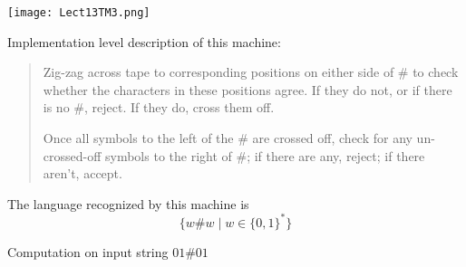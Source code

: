 \documentclass[12pt, oneside]{article}
\begin{document}
\begin{multicols}{2}
\vspace{-20pt}
\begin{center}
\texttt{[image: Lect13TM3.png]}
\end{center}

Implementation level description of this machine:
\begin{quote}
Zig-zag across tape to corresponding positions on either side of $\#$ to check whether the 
characters in these positions agree. If they do not, or if there is no $\#$, reject. If they 
do, cross them off.

Once all symbols to the left of the $\#$ are crossed off, check for any un-crossed-off symbols 
to the right of $\#$; if there are any, reject; if there aren't, accept.
\end{quote}

The language recognized by this machine is
\[
  \{ w \# w \mid w \in \{0,1\}^* \}
\]

\columnbreak

Computation on  input  string  $01\#01$


\end{multicols}
\end{document}
